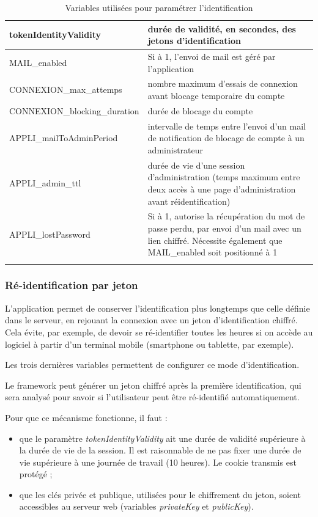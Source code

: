 \begin{longtable}{|p{6cm}|p{10cm}|}
\hline
tokenIdentityValidity & durée de validité, en secondes, des jetons d'identification\\
\hline
MAIL\_enabled & Si à 1, l'envoi de mail est géré par l'application \\
\hline
CONNEXION\_max\_attemps & nombre maximum d'essais de connexion avant blocage temporaire du compte \\
\hline
CONNEXION\_blocking\_duration & durée de blocage du compte \\
\hline
APPLI\_mailToAdminPeriod & intervalle de temps entre l'envoi d'un mail de notification de blocage de compte à un administrateur \\
\hline
APPLI\_admin\_ttl & durée de vie d'une session d'administration (temps maximum entre deux accès à une page d'administration avant réidentification) \\
\hline
APPLI\_lostPassword & Si à 1, autorise la récupération du mot de passe perdu, par envoi d'un mail avec un lien chiffré. Nécessite également que MAIL\_enabled soit positionné à 1 \\
\hline

\caption{Variables utilisées pour paramétrer l'identification}
\end{longtable}

\subsubsection{Ré-identification par jeton}

L'application permet de conserver l'identification plus longtemps que celle définie dans le serveur, en rejouant la connexion avec un jeton d'identification chiffré. Cela évite, par exemple, de devoir se ré-identifier toutes les heures si on accède au logiciel à partir d'un terminal mobile (smartphone ou tablette, par exemple).

Les trois dernières variables permettent de configurer ce mode d'identification. 

Le framework peut générer un jeton chiffré après la première identification, qui sera analysé pour savoir si l'utilisateur peut être ré-identifié automatiquement.

Pour que ce mécanisme fonctionne, il faut :
\begin{itemize}
\item que le paramètre \textit{tokenIdentityValidity} ait une durée de validité supérieure à la durée de vie de la session. Il est raisonnable de ne pas fixer une durée de vie supérieure à une journée de travail (10 heures). Le cookie transmis est protégé ;
\item que les clés privée et publique, utilisées pour le chiffrement du jeton, soient accessibles au serveur web (variables \textit{privateKey} et \textit{publicKey}).
\end{itemize}


